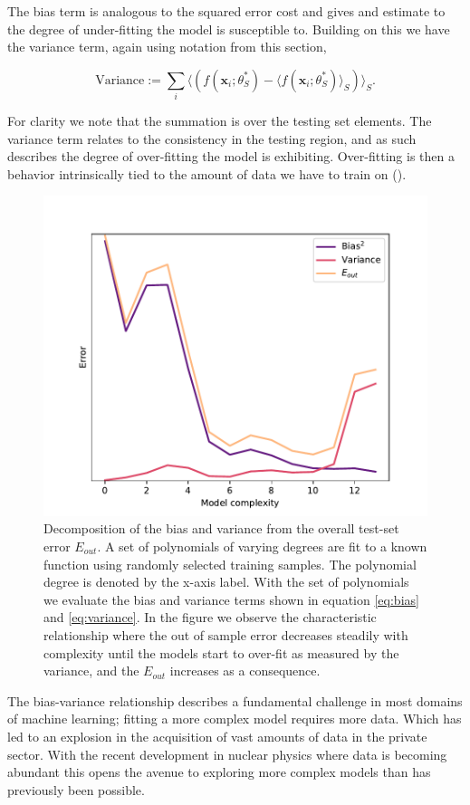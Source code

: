 \noindent The bias term is analogous to the squared error cost and gives and estimate to the degree of under-fitting the model is susceptible to. Building on this we have the variance term, again using notation from this section, 

\begin{equation}\label{eq:variance}
\text{Variance} := \sum_i \langle (f(\mathbf{x}_i; \theta^*_S) - \langle f(\mathbf{x}_i; \theta^*_S) \rangle_S)\rangle_S.
\end{equation}

\noindent For clarity we note that the summation is over the testing set elements. The variance term relates to the consistency in the testing region, and as such describes the degree of over-fitting the model is exhibiting. Over-fitting is then a behavior intrinsically tied to the amount of data we have to train on (\cite{Mehta2019}). 

\begin{figure}
\centering
\includegraphics[width=\textwidth]{../figures/bias_var_degree.pdf}
\caption[Bias-variance decomposition ]{Decomposition of the bias and variance from the overall test-set error $E_{out}$. A set of polynomials of varying degrees are fit to a known function using randomly selected training samples. The polynomial degree is denoted by the x-axis label. With the set of polynomials we evaluate the bias and variance terms shown in equation \ref{eq:bias} and \ref{eq:variance}. In the figure we observe the characteristic relationship where the out of sample error decreases steadily with complexity until the models start to over-fit as measured by the variance, and the $E_{out}$ increases as a consequence.}
\end{figure}

The bias-variance relationship describes a fundamental challenge in most domains of machine learning; fitting a more complex model requires more data. Which has led to an explosion in the acquisition of vast amounts of data in the private sector. With the recent development in nuclear physics where data is becoming abundant this opens the avenue to exploring more complex models than has previously been possible.
